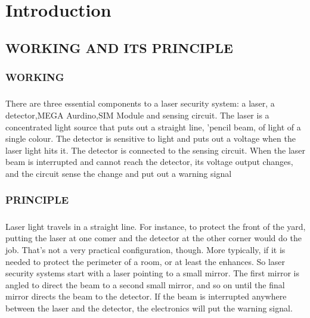 \chapter{Introduction}
\section{WORKING AND ITS PRINCIPLE}
\subsection{WORKING}
\paragraph{}There are three essential components to a laser security system: a laser, a detector,MEGA Aurdino,SIM Module and sensing circuit. The laser is a concentrated light source that puts out a straight line, 'pencil beam, of light of a single colour. The detector is sensitive to light and puts out a voltage when the laser light  hits  it.  The detector  is  connected  to  the  sensing  circuit.  When  the  laser  beam  is interrupted and cannot reach the detector, its voltage output changes, and the circuit sense the change and put out a warning signal

\subsection{PRINCIPLE}
\paragraph{}Laser light travels in a straight line. For instance, to protect the front of the yard, putting the laser at one comer and the detector at the other corner would do the job. That's not a very practical configuration, though. More typically, if it is needed to protect the perimeter of a room, or at least the enhances. So laser security systems start with a laser pointing to a small mirror. The first mirror is angled to direct the beam to a second small mirror, and so on until the final mirror directs the beam to the detector. If the beam is interrupted anywhere between the laser and the detector, the electronics will put the warning signal.